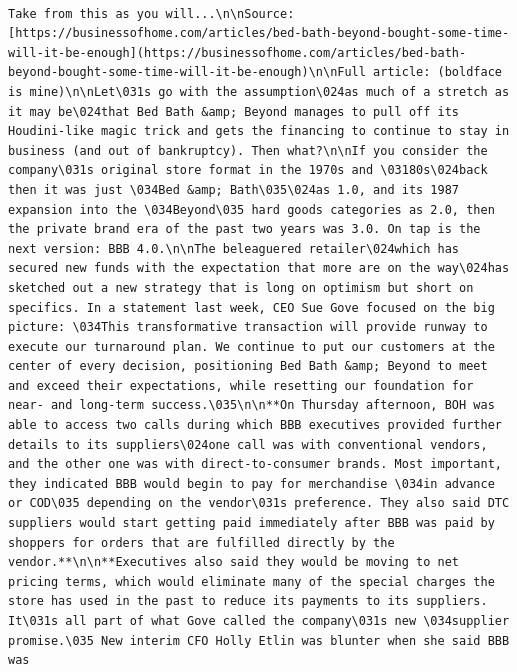 \documentclass[
  letterpaper,
  DIV=11,
  numbers=noendperiod]{scrreprt}
\begin{document}
\begin{verbatim}
                                                                                                                                                                                                                                                                                                                                                                                                                                                                                                                                                                                                                                                                                                                                                                                                                                                                                                                                                                                                                                                                                                                                               Take from this as you will...\n\nSource: [https://businessofhome.com/articles/bed-bath-beyond-bought-some-time-will-it-be-enough](https://businessofhome.com/articles/bed-bath-beyond-bought-some-time-will-it-be-enough)\n\nFull article: (boldface is mine)\n\nLet\031s go with the assumption\024as much of a stretch as it may be\024that Bed Bath &amp; Beyond manages to pull off its Houdini-like magic trick and gets the financing to continue to stay in business (and out of bankruptcy). Then what?\n\nIf you consider the company\031s original store format in the 1970s and \03180s\024back then it was just \034Bed &amp; Bath\035\024as 1.0, and its 1987 expansion into the \034Beyond\035 hard goods categories as 2.0, then the private brand era of the past two years was 3.0. On tap is the next version: BBB 4.0.\n\nThe beleaguered retailer\024which has secured new funds with the expectation that more are on the way\024has sketched out a new strategy that is long on optimism but short on specifics. In a statement last week, CEO Sue Gove focused on the big picture: \034This transformative transaction will provide runway to execute our turnaround plan. We continue to put our customers at the center of every decision, positioning Bed Bath &amp; Beyond to meet and exceed their expectations, while resetting our foundation for near- and long-term success.\035\n\n**On Thursday afternoon, BOH was able to access two calls during which BBB executives provided further details to its suppliers\024one call was with conventional vendors, and the other one was with direct-to-consumer brands. Most important, they indicated BBB would begin to pay for merchandise \034in advance or COD\035 depending on the vendor\031s preference. They also said DTC suppliers would start getting paid immediately after BBB was paid by shoppers for orders that are fulfilled directly by the vendor.**\n\n**Executives also said they would be moving to net pricing terms, which would eliminate many of the special charges the store has used in the past to reduce its payments to its suppliers. It\031s all part of what Gove called the company\031s new \034supplier promise.\035 New interim CFO Holly Etlin was blunter when she said BBB was 
\end{verbatim}
\end{document}
